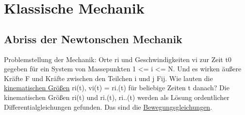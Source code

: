 \section{Klassische Mechanik}
\subsection{Abriss der Newtonschen Mechanik}
Problemstellung der Mechanik:
Orte ri und Geschwindigkeiten vi zur Zeit t0 gegeben für ein System von Massepunkten 1 <= i <= N. Und es wirken äußere Kräfte F und Kräfte zwischen den Teilchen i und j Fij.
Wie lauten die \underline{kinematischen Größen} ri(t), vi(t) = ri.(t) für beliebige Zeiten t danach?
Die kinematischen Größen ri(t) und ri.(t), ri..(t) werden als Lösung ordentlicher Differentialgleichungen gefunden. Das sind die \underline{Bewegungsgleichungen}.